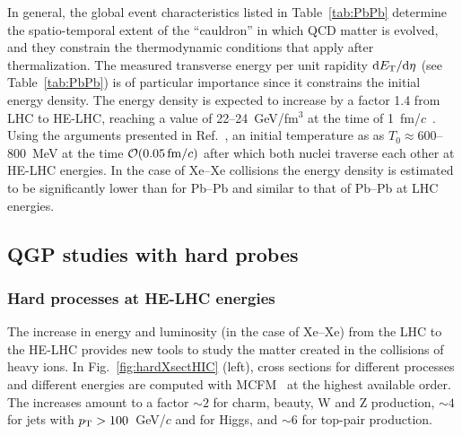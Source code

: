 \documentclass[../report.tex]{subfiles}
\begin{document}
In general, the global event characteristics listed in Table~\ref{tab:PbPb} determine the spatio-temporal extent of the ``cauldron'' in which QCD matter is evolved, and they
constrain the thermodynamic conditions that apply after thermalization. The measured transverse energy per unit rapidity ${\rm d}E_{\rm T}/{\rm d}\eta$ (see Table~\ref{tab:PbPb})
is of particular importance since it constrains the initial energy density. 
The energy density is expected to increase by a factor 1.4 from LHC to HE-LHC, reaching a value of 22--24~GeV/fm$^3$ at the time of 1~fm/$c$~\cite{Dainese:2016gch}. 
Using the arguments presented in Ref.~\cite{Dainese:2016gch}, an initial temperature as 
as $T_0\approx 600$--$800$~MeV at the time $\mathcal{O}(0.05\, {\rm fm}/c)$ after which both nuclei traverse each other at HE-LHC energies.
In the case of Xe--Xe collisions the energy density is estimated to be significantly lower than for Pb--Pb and similar to that of Pb--Pb at LHC energies.


\subsection{QGP studies with hard probes}
\label{sec:HE_hardprobes}


\subsubsection{Hard processes at HE-LHC energies}
\label{sec:HE_xsections}

The increase in energy and luminosity (in the case of Xe--Xe) from the LHC to the HE-LHC provides new tools to study the matter created in the collisions of heavy ions.
In Fig.~\ref{fig:hardXsectHIC} (left), cross sections for different processes
and different energies are computed with  MCFM~\cite{Campbell:2010ff}
at the highest available order. The increases amount to a factor
$\sim 2$ for charm, beauty, W and Z production, $\sim 4$ for jets with $p\sb{\scriptstyle\mathrm{T}}>100$~GeV/$c$ and for Higgs, and $\sim 6$ for top-pair production. 
\end{document}
